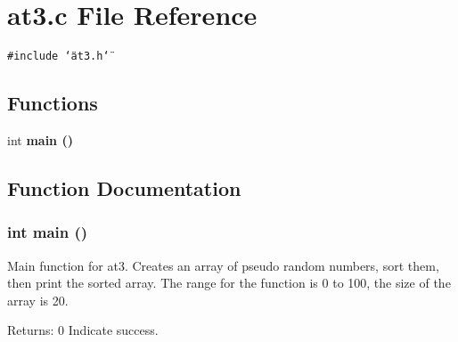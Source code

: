\section{at3.c File Reference}
\label{at3_8c}
{\tt \#include \char`\"{}at3.h\char`\"{}}\par
\subsection*{Functions}
\begin{CompactItemize}
\item 
int \bf{main} ()
\end{CompactItemize}


\subsection{Function Documentation}
\subsubsection{\setlength{\rightskip}{0pt plus 5cm}int main ()}\label{at3_8c_e66f6b31b5ad750f1fe042a706a4e3d4}


Main function for at3. Creates an array of pseudo random numbers, sort them, then print the sorted array. The range for the function is 0 to 100, the size of the array is 20. \begin{Desc}
\item[Returns:]0 Indicate success. \end{Desc}
